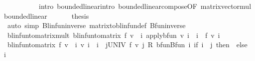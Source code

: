 \begin{isabellebody}
\ \ \ \ \ \ \ \ \ \ intro{\isacharbang}{\kern0pt}{\isacharcolon}{\kern0pt}\ bounded{\isacharunderscore}{\kern0pt}linear{\isacharunderscore}{\kern0pt}intro\ bounded{\isacharunderscore}{\kern0pt}linear{\isacharunderscore}{\kern0pt}compose{\isacharbrackleft}{\kern0pt}OF\ matrix{\isacharunderscore}{\kern0pt}vector{\isacharunderscore}{\kern0pt}mul{\isacharunderscore}{\kern0pt}bounded{\isacharunderscore}{\kern0pt}linear{\isacharbrackright}{\kern0pt}{\isacharparenright}{\kern0pt}\isanewline
\ \ \isamarkupfalse%
\isanewline
\ \ \isamarkupfalse%
\ {\isacharquery}{\kern0pt}thesis\isanewline
\ \ \ \ \isamarkupfalse%
\ {\isacharparenleft}{\kern0pt}auto\ simp{\isacharcolon}{\kern0pt}\ Blinfun{\isacharunderscore}{\kern0pt}inverse\ matrix{\isacharunderscore}{\kern0pt}to{\isacharunderscore}{\kern0pt}blinfun{\isacharunderscore}{\kern0pt}def\ Bfun{\isacharunderscore}{\kern0pt}inverse{\isacharparenright}{\kern0pt}\isanewline
{}\isamarkupfalse%
%
\endisatagproof
{\isafoldproof}%
%
\isadelimproof
\isanewline
%
\endisadelimproof
\isanewline
{}\isamarkupfalse%
\ blinfun{\isacharunderscore}{\kern0pt}to{\isacharunderscore}{\kern0pt}matrix{\isacharunderscore}{\kern0pt}mult{\isacharcolon}{\kern0pt}\ {\isachardoublequoteopen}{\isacharparenleft}{\kern0pt}blinfun{\isacharunderscore}{\kern0pt}to{\isacharunderscore}{\kern0pt}matrix\ f\ {\isacharasterisk}{\kern0pt}v\ {\isacharparenleft}{\kern0pt}{\isasymchi}\ i{\isachardot}{\kern0pt}\ apply{\isacharunderscore}{\kern0pt}bfun\ v\ i{\isacharparenright}{\kern0pt}{\isacharparenright}{\kern0pt}\ {\isachardollar}{\kern0pt}\ i\ {\isacharequal}{\kern0pt}\ f\ v\ i{\isachardoublequoteclose}\isanewline
%
\isadelimproof
%
\endisadelimproof
%
\isatagproof
{}\isamarkupfalse%
\ {\isacharminus}{\kern0pt}\isanewline
\ \ \isamarkupfalse%
\ {\isachardoublequoteopen}{\isacharparenleft}{\kern0pt}blinfun{\isacharunderscore}{\kern0pt}to{\isacharunderscore}{\kern0pt}matrix\ f\ {\isacharasterisk}{\kern0pt}v\ {\isacharparenleft}{\kern0pt}{\isasymchi}\ i{\isachardot}{\kern0pt}\ v\ i{\isacharparenright}{\kern0pt}{\isacharparenright}{\kern0pt}\ {\isachardollar}{\kern0pt}\ i\ {\isacharequal}{\kern0pt}\ {\isacharparenleft}{\kern0pt}{\isasymSum}j{\isasymin}UNIV{\isachardot}{\kern0pt}\ {\isacharparenleft}{\kern0pt}f\ {\isacharparenleft}{\kern0pt}{\isacharparenleft}{\kern0pt}v\ j\ {\isacharasterisk}{\kern0pt}\isactrlsub R\ bfun{\isachardot}{\kern0pt}Bfun\ {\isacharparenleft}{\kern0pt}{\isasymlambda}i{\isachardot}{\kern0pt}\ if\ i\ {\isacharequal}{\kern0pt}\ j\ then\ {}\ else\ {}{\isacharparenright}{\kern0pt}{\isacharparenright}{\kern0pt}{\isacharparenright}{\kern0pt}{\isacharparenright}{\kern0pt}\ i{\isacharparenright}{\kern0pt}{\isachardoublequoteclose}\isanewline

\end{isabellebody}
